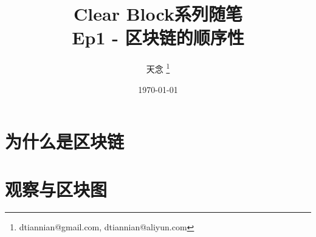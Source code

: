 \documentclass{beamer}
\title{Clear Block系列随笔 \\ Ep1 - 区块链的顺序性}
\author{天念 \thanks{dtiannian@gmail.com, dtiannian@aliyun.com}}
\date{\today}
\begin{document}
\begin{frame}
    \titlepage
\end{frame}

\section{为什么是区块链}



\section{观察与区块图}


\end{document}

